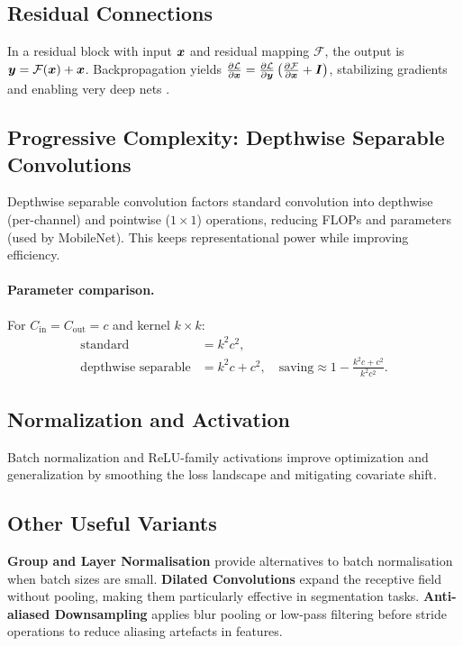 \subsection{Residual Connections}
In a residual block with input $\boldsymbol{x}$ and residual mapping $\mathcal{F}$, the output is $\boldsymbol{y}=\mathcal{F}(\boldsymbol{x})+\boldsymbol{x}$. Backpropagation yields $\frac{\partial \mathcal{L}}{\partial \boldsymbol{x}}=\frac{\partial \mathcal{L}}{\partial \boldsymbol{y}}\left(\frac{\partial \mathcal{F}}{\partial \boldsymbol{x}}+\boldsymbol{I}\right)$, stabilizing gradients and enabling very deep nets \cite{He2016}.

\subsection{Progressive Complexity: Depthwise Separable Convolutions}
Depthwise separable convolution factors standard convolution into depthwise (per-channel) and pointwise ($1\times1$) operations, reducing FLOPs and parameters (used by MobileNet). This keeps representational power while improving efficiency.

\paragraph{Parameter comparison.} For $C_{\text{in}}=C_{\text{out}}=c$ and kernel $k\times k$:
\begin{align}
\text{standard} &= k^2 c^2,\\
\text{depthwise separable} &= k^2 c + c^2,\quad \text{saving} \approx 1 - \frac{k^2 c + c^2}{k^2 c^2}.
\end{align}

\subsection{Normalization and Activation}
Batch normalization \cite{Ioffe2015} and ReLU-family activations improve optimization and generalization by smoothing the loss landscape and mitigating covariate shift.

\subsection{Other Useful Variants}

\textbf{Group and Layer Normalisation} provide alternatives to batch normalisation when batch sizes are small. \textbf{Dilated Convolutions} expand the receptive field without pooling, making them particularly effective in segmentation tasks. \textbf{Anti-aliased Downsampling} applies blur pooling or low-pass filtering before stride operations to reduce aliasing artefacts in features.


